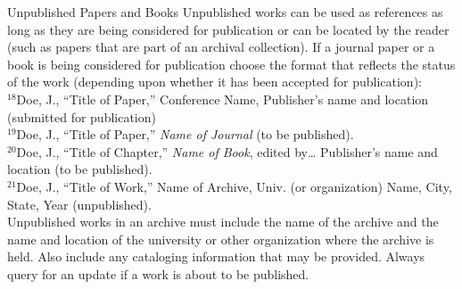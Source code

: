 Unpublished Papers and Books
Unpublished works can be used as references as long as they are being considered for publication or can be located by the reader (such as papers that are part of an archival collection). If a journal paper or a book is being considered for publication choose the format that reflects the status of the work (depending upon whether it has been accepted for publication): \\

$^{18}$Doe, J., “Title of Paper,” Conference Name, Publisher’s name and location (submitted for publication) \\
$^{19}$Doe, J., “Title of Paper,” \textit{Name of Journal} (to be published). \\
$^{20}$Doe, J., “Title of Chapter,” \textit{Name of Book}, edited by… Publisher’s name and location (to be published). \\
$^{21}$Doe, J., “Title of Work,” Name of Archive, Univ. (or organization) Name, City, State, Year (unpublished). \\

Unpublished works in an archive must include the name of the archive and the name and location of the university or other organization where the archive is held. Also include any cataloging information that may be provided. Always query for an update if a work is about to be published.